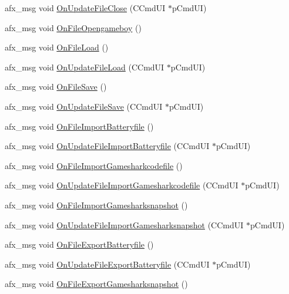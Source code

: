 \begin{DoxyCompactItemize}
\item 
afx\+\_\+msg void \mbox{\hyperlink{class_main_wnd_a2a6f2246f0bced548c0267e1869896f4}{On\+Update\+File\+Close}} (C\+Cmd\+UI $\ast$p\+Cmd\+UI)
\item 
afx\+\_\+msg void \mbox{\hyperlink{class_main_wnd_ad1cfc9f500a8049610e1b7bc4c5ce725}{On\+File\+Opengameboy}} ()
\item 
afx\+\_\+msg void \mbox{\hyperlink{class_main_wnd_a50801b3ffe4aa323fdd654dc56e71d32}{On\+File\+Load}} ()
\item 
afx\+\_\+msg void \mbox{\hyperlink{class_main_wnd_acb0b11e80174e75041bf222d5025e860}{On\+Update\+File\+Load}} (C\+Cmd\+UI $\ast$p\+Cmd\+UI)
\item 
afx\+\_\+msg void \mbox{\hyperlink{class_main_wnd_a962abbb99f5b6bba3f05ba043358584e}{On\+File\+Save}} ()
\item 
afx\+\_\+msg void \mbox{\hyperlink{class_main_wnd_a751b8875a072014c27ec1eb4648e03b9}{On\+Update\+File\+Save}} (C\+Cmd\+UI $\ast$p\+Cmd\+UI)
\item 
afx\+\_\+msg void \mbox{\hyperlink{class_main_wnd_abea55fe16d21636d4c8704dd1fdfcfe9}{On\+File\+Import\+Batteryfile}} ()
\item 
afx\+\_\+msg void \mbox{\hyperlink{class_main_wnd_a8495cabf7c5e45a773160b17a0555da7}{On\+Update\+File\+Import\+Batteryfile}} (C\+Cmd\+UI $\ast$p\+Cmd\+UI)
\item 
afx\+\_\+msg void \mbox{\hyperlink{class_main_wnd_a3e7abf73687cb0dbf61c3707de5e10f4}{On\+File\+Import\+Gamesharkcodefile}} ()
\item 
afx\+\_\+msg void \mbox{\hyperlink{class_main_wnd_aec0517b8da64f0752ce975f0ac84d8a1}{On\+Update\+File\+Import\+Gamesharkcodefile}} (C\+Cmd\+UI $\ast$p\+Cmd\+UI)
\item 
afx\+\_\+msg void \mbox{\hyperlink{class_main_wnd_a1ba9d10fce306e309613d8e06097219c}{On\+File\+Import\+Gamesharksnapshot}} ()
\item 
afx\+\_\+msg void \mbox{\hyperlink{class_main_wnd_a12a769f8883bf0abc2e51764b6969ecd}{On\+Update\+File\+Import\+Gamesharksnapshot}} (C\+Cmd\+UI $\ast$p\+Cmd\+UI)
\item 
afx\+\_\+msg void \mbox{\hyperlink{class_main_wnd_a0da8957d2bcd55859914b0013c6d21f7}{On\+File\+Export\+Batteryfile}} ()
\item 
afx\+\_\+msg void \mbox{\hyperlink{class_main_wnd_af5aa05b853a2792f8448f2e331c5e44a}{On\+Update\+File\+Export\+Batteryfile}} (C\+Cmd\+UI $\ast$p\+Cmd\+UI)
\item 
afx\+\_\+msg void \mbox{\hyperlink{class_main_wnd_ae567674cd79ab30eb420af2f91f5688c}{On\+File\+Export\+Gamesharksnapshot}} ()

\end{DoxyCompactItemize}
